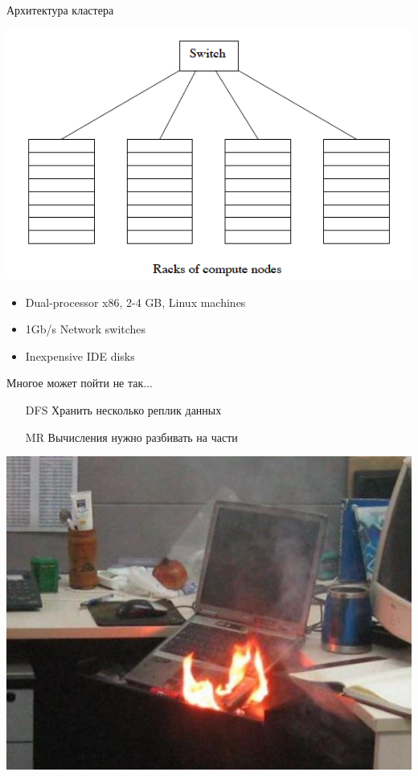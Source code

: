\documentclass[10pt,a4paper]{beamer}
\begin{document}
\begin{frame}{Архитектура кластера}

\begin{center}
\includegraphics[scale=0.4]{images/cluster.png}
\end{center}

\begin{itemize}
\item Dual-processor x86, 2-4 GB, Linux machines
\item 1Gb/s Network switches
\item Inexpensive IDE disks
\end{itemize}

\end{frame}


\begin{frame}{Многое может пойти не так...}

\begin{itemize}
\item[DFS] Хранить несколько реплик данных
\item[MR] Вычисления нужно разбивать на части
\end{itemize}

\begin{center}
\includegraphics[scale=0.35]{images/fail.jpg}
\end{center}

\end{frame}
\end{document}
